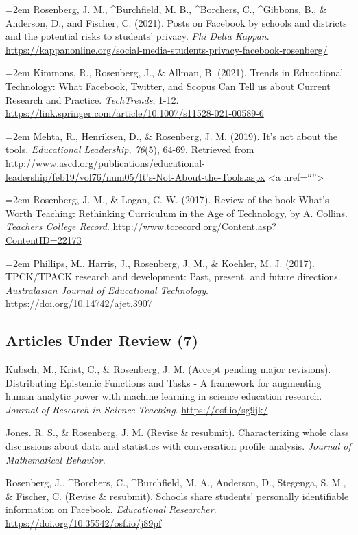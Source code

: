 \documentclass[
  14,
]{article}
\begin{document}
\hangindent=2em Rosenberg, J. M., \^{}Burchfield, M. B., \^{}Borchers,
C., \^{}Gibbons, B., \& Anderson, D., and Fischer, C. (2021). Posts on
Facebook by schools and districts and the potential risks to students'
privacy. \emph{Phi Delta Kappan}.
\url{https://kappanonline.org/social-media-students-privacy-facebook-rosenberg/}

\hangindent=2em Kimmons, R., Rosenberg, J., \& Allman, B. (2021). Trends
in Educational Technology: What Facebook, Twitter, and Scopus Can Tell
us about Current Research and Practice. \emph{TechTrends}, 1-12.
\url{https://link.springer.com/article/10.1007/s11528-021-00589-6}

\hangindent=2em Mehta, R., Henriksen, D., \& Rosenberg, J. M. (2019).
It's not about the tools. \emph{Educational Leadership, 76}(5), 64-69.
Retrieved from
\url{http://www.ascd.org/publications/educational-leadership/feb19/vol76/num05/It's-Not-About-the-Tools.aspx}
\textless a href=``''\textgreater{}

\hangindent=2em Rosenberg, J. M., \& Logan, C. W. (2017). Review of the
book What's Worth Teaching: Rethinking Curriculum in the Age of
Technology, by A. Collins. \emph{Teachers College Record}.
\url{http://www.tcrecord.org/Content.asp?ContentID=22173}

\hangindent=2em Phillips, M., Harris, J., Rosenberg, J. M., \& Koehler,
M. J. (2017). TPCK/TPACK research and development: Past, present, and
future directions. \emph{Australasian Journal of Educational
Technology}. \url{https://doi.org/10.14742/ajet.3907}

\hypertarget{articles-under-review-7}{%
\subsection{Articles Under Review (7)}\label{articles-under-review-7}}

Kubsch, M., Krist, C., \& Rosenberg, J. M. (Accept pending major
revisions). Distributing Epistemic Functions and Tasks - A framework for
augmenting human analytic power with machine learning in science
education research. \emph{Journal of Research in Science Teaching}.
\url{https://osf.io/sg9jk/}

Jones. R. S., \& Rosenberg, J. M. (Revise \& resubmit). Characterizing
whole class discussions about data and statistics with conversation
profile analysis. \emph{Journal of Mathematical Behavior.}

Rosenberg, J., \^{}Borchers, C., \^{}Burchfield, M. A., Anderson, D.,
Stegenga, S. M., \& Fischer, C. (Revise \& resubmit). Schools share
students' personally identifiable information on Facebook.
\emph{Educational Researcher}.
\url{https://doi.org/10.35542/osf.io/j89pf}
\end{document}
